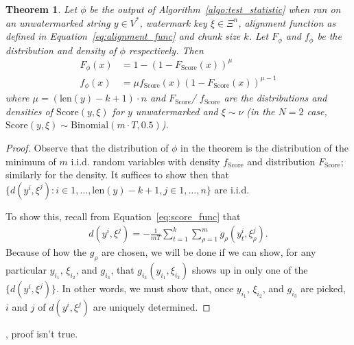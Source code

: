 \documentclass[twocolumn,9pt]{extarticle}
\newtheorem{theorem}{Theorem}[section]
\begin{document}
\begin{theorem}
	Let $\phi $ be the output of Algorithm~\ref{algo:test_statistic} when ran on
	an unwatermarked string $y \in V^*$, watermark key $\xi \in \Xi^n$, alignment function
	as defined in Equation~\ref{eq:alignment_func} and chunk size $k$. Let $F_\phi$ and $f_\phi$ be the distribution and
	density of $\phi$ respectively. Then
	\begin{align*}
	F_\phi(x) &= 1 - (1 - F_\mathrm{Score}(x))^\mu\\
	f_\phi(x) &= \mu f_\mathrm{Score}(x)(1 - F_\mathrm{Score}(x))^{\mu - 1}
\end{align*}
where $\mu = (\mathrm{len}(y) - k + 1) \cdot n$ and $F_\mathrm{Score}$/
$f_\mathrm{Score}$ are the distributions and densities of $\mathrm{Score}(y, \xi)$ for $y$ unwatermarked and $\xi \sim \nu$ (in the $N = 2$ case, $\mathrm{Score}(y, \xi)\sim \mathrm{Binomial}(m\cdot T, 0.5)$).
\end{theorem}
\begin{proof}
	Observe that the distribution of $\phi$ in the theorem is the distribution of the minimum of $m$ i.i.d. random variables with density $f_{\mathrm{Score}}$ and distribution $F_{\mathrm{Score}}$; similarly for the density. It suffices to show then that $\{d(y^i, \xi^j): i\in 1, \ldots, \mathrm{len}(y) - k + 1, j\in 1, \ldots, n\}$ are i.i.d.

	To show this, recall from Equation~\ref{eq:score_func} that
	\begin{align}
		d(y^i, \xi^j) = -\frac{1}{mT}\sum_{t = 1}^k\sum_{\rho = 1}^mg_\rho(y_t^i, \xi_\rho^j).
	\end{align}
	Because of how the $g_\rho$ are chosen, we will be done if we can show, for any particular $y_{i_1}$, $\xi_{i_2}$, and $g_{i_3}$, that $g_{i_3}(y_{i_1}, \xi_{i_2})$ shows up in only one of the $\{d(y^i, \xi^j)\}$. In other words, we must show that, once $y_{i_1}$, $\xi_{i_2}$, and $g_{i_3}$ are picked, $i$ and $j$ of $d(y^i, \xi^j)$ are uniquely determined. 
\end{proof}
\TODO, proof isn't true. 
\end{document}
